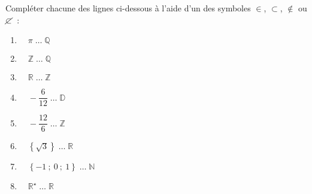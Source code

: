 
Compléter chacune des lignes ci-dessous à l'aide d'un des symboles $\in$, $\subset$, $\notin$ ou $\cancel{\subset}$~:
\begin{enumerate}[label=\alph*.]
     \item %
     $\quad \pi \; \ldots \;  \mathbb{Q}$
     \item %
     $\quad \mathbb{Z} \; \ldots \;  \mathbb{Q}$
     \item %
     $\quad \mathbb{R} \; \ldots \;  \mathbb{Z}$
     \item %
     $\quad -\dfrac{6}{12} \; \ldots \;  \mathbb{D}$
     \item %
     $\quad -\dfrac{12}{6} \; \ldots \;  \mathbb{Z}$
     \item %
     $\quad \left\{\sqrt{3}\right\} \; \ldots \;  \mathbb{R}$
     \item %
     $\quad \left\{-1~;~0~;~1\right\} \; \ldots \;  \mathbb{N}$
     \item %
     $\quad \mathbb{R}^\star \; \ldots \;  \mathbb{R}$
\end{enumerate}

